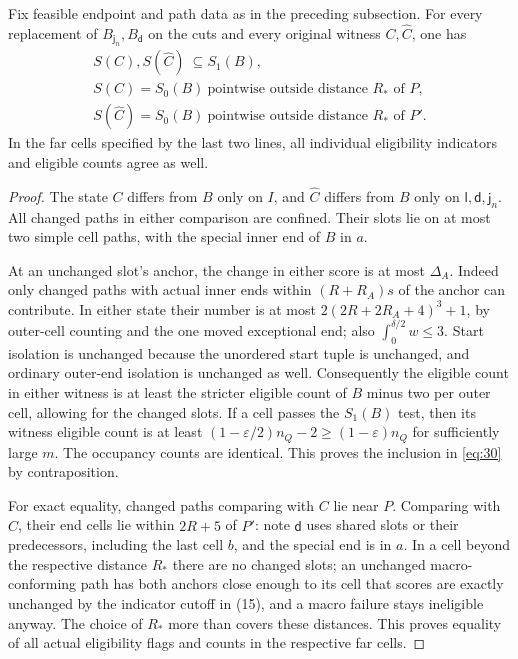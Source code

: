 \begin{lemma}\label{lem:replacement-stability}
Fix feasible endpoint and path data as in the preceding subsection.
For every replacement of $B_{\mathsf j_n},B_{\mathsf d}$ on the cuts
and every original witness $C,\widehat C$, one has
\[
 \begin{gathered}
        S(C),S(\widehat C)\ \subseteq S_1(B),\\
        S(C)=S_0(B)\ \text{pointwise outside distance }R_*\text{ of }P,\\
        S(\widehat C)=S_0(B)\ \text{pointwise outside distance }R_*\text{ of }P'.
\end{gathered}                                                       \tag{30}\label{eq:30}
\]
In the far cells specified by the last two lines, all individual
eligibility indicators and eligible counts agree as well.
\end{lemma}
\begin{proof}
The state $C$ differs from $B$ only on $I$, and $\widehat C$ differs
from $B$ only on $\mathsf l,\mathsf d,\mathsf j_n$. All changed paths
in either comparison are confined. Their slots lie on at most two simple
cell paths, with the special inner end of $B$ in $a$.

At an unchanged slot's anchor, the change in either score is at most
$\Delta_A$. Indeed only changed paths with actual inner ends within
$(R+R_A)s$ of the anchor can contribute. In either state their number
is at most $2(2R+2R_A+4)^3+1$, by outer-cell counting and the one moved
exceptional end; also $\int_0^{\delta/2}w\le3$. Start isolation is
unchanged because the unordered start tuple is unchanged, and ordinary
outer-end isolation is unchanged as well. Consequently the eligible
count in either witness is at least the stricter eligible count of $B$
minus two per outer cell, allowing for the changed slots. If a cell
passes the $S_1(B)$ test, then its witness eligible count is at least
$(1-\varepsilon/2)n_Q-2\ge(1-\varepsilon)n_Q$ for sufficiently large
$m$. The occupancy counts are identical. This proves the inclusion
in \eqref{eq:30} by contraposition.

For exact equality, changed paths comparing with \(C\) lie near \(P\). Comparing with \(\widehat C\), their end cells lie within \(2R+5\) of \(P'\): note \(\mathsf d\) uses shared slots or their predecessors, including the last cell \(b\), and the special end is in \(a\). In a cell beyond the respective distance \(R_*\) there are no changed slots; an unchanged macro-conforming path has both anchors close enough to its cell that scores are exactly unchanged by the indicator cutoff in (15), and a macro failure stays ineligible anyway. The choice of \(R_*\) more than covers these distances. This proves equality of all actual eligibility flags and counts in the respective far cells.
\end{proof}

